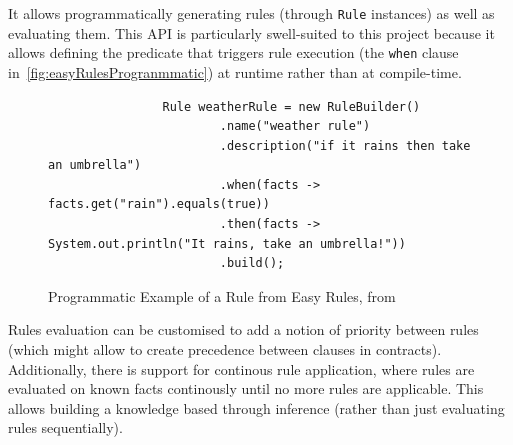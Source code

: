 It allows programmatically generating rules (through \texttt{Rule} instances) as well as evaluating them.
This API is particularly swell-suited to this project because it allows defining the predicate that triggers rule execution (the \texttt{when} clause in~\autoref{fig:easyRulesProgranmmatic}) at runtime rather than at compile-time.

\begin{figure}[h]
        \begin{verbatim}
                Rule weatherRule = new RuleBuilder()
                        .name("weather rule")
                        .description("if it rains then take an umbrella")
                        .when(facts -> facts.get("rain").equals(true))
                        .then(facts -> System.out.println("It rains, take an umbrella!"))
                        .build();
        \end{verbatim}
    \caption[Programmatic Example of a Rule from Easy Rules]{Programmatic Example of a Rule from Easy Rules, from~\cite{easyRules}}
    \label{fig:easyRulesProgranmmatic}
\end{figure}

Rules evaluation can be customised to add a notion of priority between rules (which might allow to create precedence between clauses in contracts).
Additionally, there is support for continous rule application, where rules are evaluated on known facts continously until no more rules are applicable.
This allows building a knowledge based through inference (rather than just evaluating rules sequentially).
